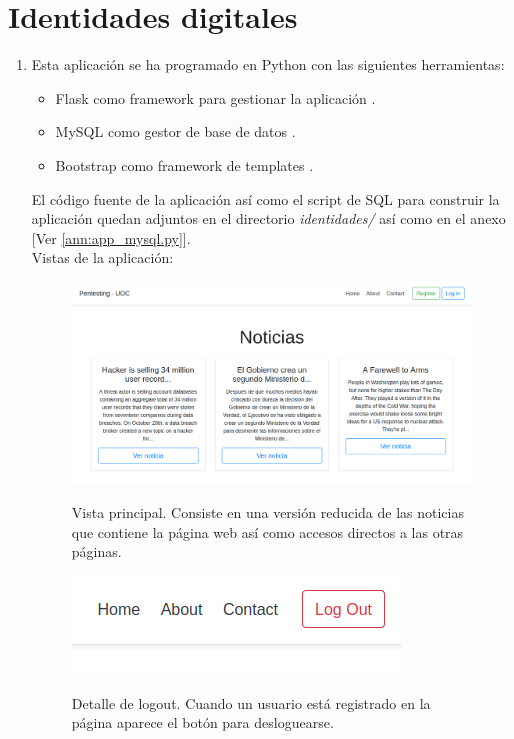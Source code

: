 \documentclass[a4paper,oneside]{article}
\begin{document}
\section{Identidades digitales}
\begin{enumerate}[label=\textbf{\alph*)}]
\item Esta aplicación se ha programado en Python con las siguientes herramientas:
\begin{itemize}
\item Flask como framework para gestionar la aplicación \cite{flask}.
\item MySQL como gestor de base de datos \cite{mysql}.
\item Bootstrap como framework de templates \cite{bootstrap}.
\end{itemize}

El código fuente de la aplicación así como el script de SQL para construir la aplicación quedan adjuntos en el directorio \textit{identidades/} así como en el anexo [Ver \ref{ann:app_mysql.py}].\\

Vistas de la aplicación:

\begin{figure}[h!]
  \centering
  \includegraphics[scale=0.4]{images/index.png}\\
  \caption{Vista principal. Consiste en una versión reducida de las noticias que contiene la página web así como accesos directos a las otras páginas.}
  \label{fig:index}
\end{figure}

\begin{figure}[h!]
  \centering
  \includegraphics{images/logout.png}\\
  \caption{Detalle de logout. Cuando un usuario está registrado en la página aparece el botón para desloguearse.}
  \label{fig:logout}
\end{figure}


\end{enumerate}
\end{document}
